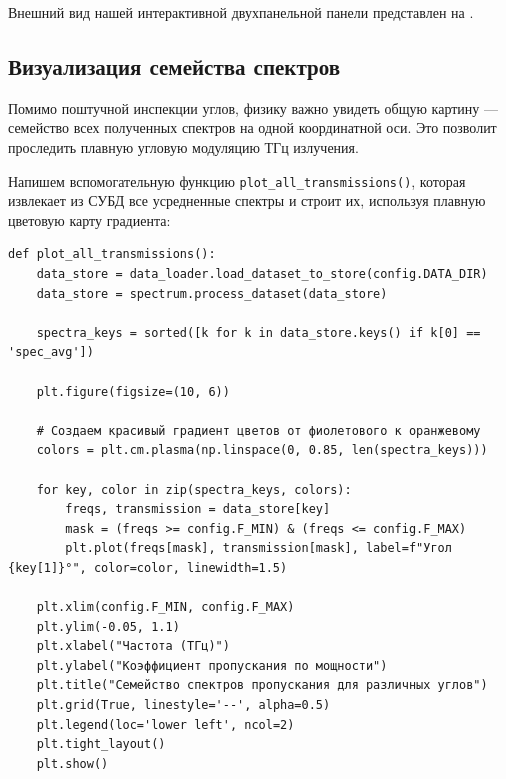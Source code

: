 
Внешний вид нашей интерактивной двухпанельной панели представлен на .


\subsection{Визуализация семейства спектров}

Помимо поштучной инспекции углов, физику важно увидеть общую картину — семейство всех полученных спектров на одной координатной оси. Это позволит проследить плавную угловую модуляцию ТГц излучения.

Напишем вспомогательную функцию \texttt{plot\_all\_transmissions()}, которая извлекает из СУБД все усредненные спектры и строит их, используя плавную цветовую карту градиента:

\begin{listing}[H]
	\caption{Построение семейства кривых пропускания (interactive\_plots.py)}
	\begin{verbatim}
def plot_all_transmissions():
    data_store = data_loader.load_dataset_to_store(config.DATA_DIR)
    data_store = spectrum.process_dataset(data_store)
    
    spectra_keys = sorted([k for k in data_store.keys() if k[0] == 'spec_avg'])
    
    plt.figure(figsize=(10, 6))
    
    # Создаем красивый градиент цветов от фиолетового к оранжевому
    colors = plt.cm.plasma(np.linspace(0, 0.85, len(spectra_keys)))
    
    for key, color in zip(spectra_keys, colors):
        freqs, transmission = data_store[key]
        mask = (freqs >= config.F_MIN) & (freqs <= config.F_MAX)
        plt.plot(freqs[mask], transmission[mask], label=f"Угол {key[1]}°", color=color, linewidth=1.5)
        
    plt.xlim(config.F_MIN, config.F_MAX)
    plt.ylim(-0.05, 1.1)
    plt.xlabel("Частота (ТГц)")
    plt.ylabel("Коэффициент пропускания по мощности")
    plt.title("Семейство спектров пропускания для различных углов")
    plt.grid(True, linestyle='--', alpha=0.5)
    plt.legend(loc='lower left', ncol=2)
    plt.tight_layout()
    plt.show()
	\end{verbatim}
\end{listing}




